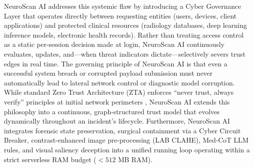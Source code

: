 \documentclass[conference]{IEEEtran}
\begin{document}
NeuroScan AI addresses this systemic flaw by introducing a Cyber Governance Layer that operates directly between requesting entities (users, devices, client applications) and protected clinical resources (radiology databases, deep learning inference models, electronic health records). Rather than treating access control as a static per-session decision made at login, NeuroScan AI continuously evaluates, updates, and—when threat indicators dictate—selectively severs trust edges in real time. The governing principle of NeuroScan AI is that even a successful system breach or corrupted payload submission must never automatically lead to lateral network control or diagnostic model corruption. While standard Zero Trust Architecture (ZTA) enforces ``never trust, always verify'' principles at initial network perimeters \cite{rose2020}, NeuroScan AI extends this philosophy into a continuous, graph-structured trust model that evolves dynamically throughout an incident's lifecycle. Furthermore, NeuroScan AI integrates forensic state preservation, surgical containment via a Cyber Circuit Breaker, contrast-enhanced image pre-processing (LAB CLAHE), Med-CoT LLM rules, and visual saliency deception into a unified running loop operating within a strict serverless RAM budget ($< 512$ MB RAM).
\end{document}

